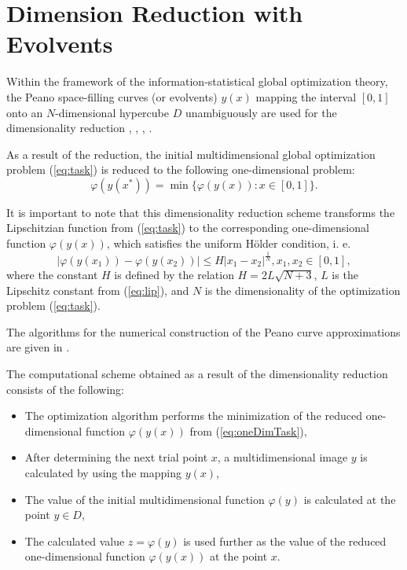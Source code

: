 \documentclass{svproc}
\begin{document}
\section{Dimension Reduction with Evolvents}
Within the framework of the information-statistical global optimization theory,
the Peano space-filling curves (or evolvents) \(y(x)\) mapping the interval \([0,1]\)
onto an \(N\)-dimensional hypercube \(D\) unambiguously are used for the dimensionality
reduction \cite{sergeyevStronginLera2013}, \cite{strongin1978},
\cite{stronginGergelBarkalovParGO}, \cite{strSergGO}.
\par
As a result of the reduction, the initial multidimensional global optimization
problem (\ref{eq:task}) is reduced to the following one-dimensional problem:
\begin{equation}
\label{eq:oneDimTask}
\varphi(y(x^*))=\min\{\varphi(y(x)):x\in [0,1]\}.
\end{equation}
\par
It is important to note that this dimensionality reduction scheme transforms the %
Lipschitzian function from (\ref{eq:task}) to the corresponding one-dimensional
function \(\varphi(y(x))\), which satisfies the uniform H{\"o}lder condition, i. e.
\begin{equation}
\label{eq:holder}
|\varphi(y(x_1))-\varphi(y(x_2))|\leq H{|x_1-x_2|}^{\frac{1}{N}}, x_1,x_2\in[0,1],
\end{equation}
where the constant $H$ is defined by the relation \(H=2L\sqrt{N+3}\), \(L\) is the Lipschitz
constant from (\ref{eq:lip}), and \(N\) is the dimensionality of the optimization problem
(\ref{eq:task}).
\par
The algorithms for the numerical construction of the Peano curve approximations are
given in \cite{strSergGO}.

\par
The computational scheme obtained as a result of the dimensionality reduction consists of the
following:
\begin{itemize}
  \item The optimization algorithm performs the minimization of the reduced one-dimensional
  function \(\varphi(y(x))\) from (\ref{eq:oneDimTask}),
  \item After determining the next trial point \(x\), a multidimensional image \(y\) is calculated by
using the mapping \(y(x)\),
  \item The value of the initial multidimensional function \(\varphi(y)\) is calculated at the point
\(y\in D\),
  \item The calculated value \(z=\varphi(y)\) is used further as the value of the reduced one-dimensional function \(\varphi(y(x))\) at the point \(x\).
\end{itemize}
\end{document}
